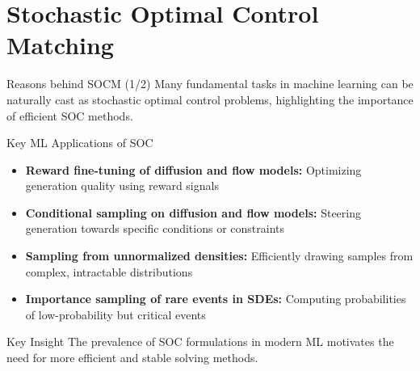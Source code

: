 \documentclass[aspectratio=169,xcolor=dvipsnames]{beamer}
\begin{document}
\section{Stochastic Optimal Control Matching}

\begin{frame}{Reasons behind SOCM (1/2)}
    Many fundamental tasks in machine learning can be naturally cast as stochastic optimal control problems, highlighting the importance of efficient SOC methods.
    
    \vspace{0.4cm}
    
    \begin{block}{Key ML Applications of SOC}
        \begin{itemize}
            \item \textbf{Reward fine-tuning of diffusion and flow models:} Optimizing generation quality using reward signals
            
            \vspace{0.2cm}
            
            \item \textbf{Conditional sampling on diffusion and flow models:} Steering generation towards specific conditions or constraints
            
            \vspace{0.2cm}
            
            \item \textbf{Sampling from unnormalized densities:} Efficiently drawing samples from complex, intractable distributions
            
            \vspace{0.2cm}
            
            \item \textbf{Importance sampling of rare events in SDEs:} Computing probabilities of low-probability but critical events
        \end{itemize}
    \end{block}
    
    \vspace{0.3cm}
    
    \begin{alertblock}{Key Insight}
        The prevalence of SOC formulations in modern ML motivates the need for more efficient and stable solving methods.
    \end{alertblock}
\end{frame}
\end{document}
